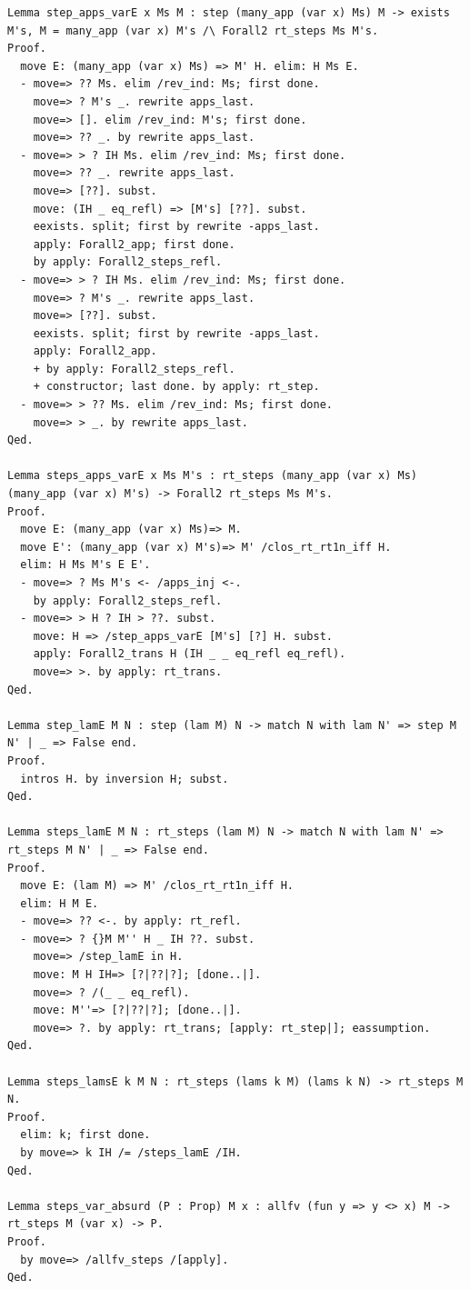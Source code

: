 \documentclass[10pt,a4paper]{amsart}
\begin{document}
\begin{lstlisting}
Lemma step_apps_varE x Ms M : step (many_app (var x) Ms) M -> exists M's, M = many_app (var x) M's /\ Forall2 rt_steps Ms M's.
Proof.
  move E: (many_app (var x) Ms) => M' H. elim: H Ms E.
  - move=> ?? Ms. elim /rev_ind: Ms; first done.
    move=> ? M's _. rewrite apps_last.
    move=> []. elim /rev_ind: M's; first done.
    move=> ?? _. by rewrite apps_last.
  - move=> > ? IH Ms. elim /rev_ind: Ms; first done.
    move=> ?? _. rewrite apps_last.
    move=> [??]. subst.
    move: (IH _ eq_refl) => [M's] [??]. subst.
    eexists. split; first by rewrite -apps_last.
    apply: Forall2_app; first done.
    by apply: Forall2_steps_refl.
  - move=> > ? IH Ms. elim /rev_ind: Ms; first done.
    move=> ? M's _. rewrite apps_last.
    move=> [??]. subst.
    eexists. split; first by rewrite -apps_last.
    apply: Forall2_app.
    + by apply: Forall2_steps_refl.
    + constructor; last done. by apply: rt_step.
  - move=> > ?? Ms. elim /rev_ind: Ms; first done.
    move=> > _. by rewrite apps_last.
Qed.

Lemma steps_apps_varE x Ms M's : rt_steps (many_app (var x) Ms) (many_app (var x) M's) -> Forall2 rt_steps Ms M's.
Proof.
  move E: (many_app (var x) Ms)=> M.
  move E': (many_app (var x) M's)=> M' /clos_rt_rt1n_iff H.
  elim: H Ms M's E E'.
  - move=> ? Ms M's <- /apps_inj <-.
    by apply: Forall2_steps_refl.
  - move=> > H ? IH > ??. subst.
    move: H => /step_apps_varE [M's] [?] H. subst.
    apply: Forall2_trans H (IH _ _ eq_refl eq_refl).
    move=> >. by apply: rt_trans.
Qed.

Lemma step_lamE M N : step (lam M) N -> match N with lam N' => step M N' | _ => False end.
Proof.
  intros H. by inversion H; subst.
Qed.

Lemma steps_lamE M N : rt_steps (lam M) N -> match N with lam N' => rt_steps M N' | _ => False end.
Proof.
  move E: (lam M) => M' /clos_rt_rt1n_iff H.
  elim: H M E.
  - move=> ?? <-. by apply: rt_refl.
  - move=> ? {}M M'' H _ IH ??. subst.
    move=> /step_lamE in H.
    move: M H IH=> [?|??|?]; [done..|].
    move=> ? /(_ _ eq_refl).
    move: M''=> [?|??|?]; [done..|].
    move=> ?. by apply: rt_trans; [apply: rt_step|]; eassumption.
Qed.

Lemma steps_lamsE k M N : rt_steps (lams k M) (lams k N) -> rt_steps M N.
Proof.
  elim: k; first done.
  by move=> k IH /= /steps_lamE /IH.
Qed.

Lemma steps_var_absurd (P : Prop) M x : allfv (fun y => y <> x) M -> rt_steps M (var x) -> P.
Proof.
  by move=> /allfv_steps /[apply].
Qed.


\end{lstlisting}
\end{document}

